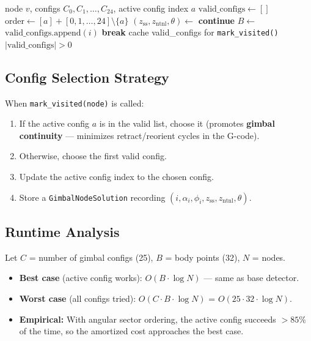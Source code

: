 \documentclass[11pt,a4paper]{article}
\newcommand{\Oh}[1]{$O(#1)$}
\newcommand{\funcname}[1]{\texttt{\textcolor{codepurple}{#1}}}
\begin{document}
\begin{algorithm}[H]
\caption{Gimbal Solver Validity Check}
\begin{algorithmic}[1]
\Require node $v$, configs $C_0, C_1, \ldots, C_{24}$, active config index $a$
\State $\text{valid\_configs} \gets []$
\State $\text{order} \gets [a] + [0, 1, \ldots, 24] \setminus \{a\}$ 
    \State $(z_\text{ss}, z_\text{ntnl}, \theta) \gets$ 
     \textbf{continue} \EndIf
    \State $B \gets$ 
        \State $\text{valid\_configs}.\text{append}(i)$
         \textbf{break} 
        \EndIf
    \EndIf
\EndFor
\State cache valid\_configs for \funcname{mark\_visited()}
\Return $|\text{valid\_configs}| > 0$
\end{algorithmic}
\end{algorithm}

\subsection{Config Selection Strategy}

When \funcname{mark\_visited(node)} is called:
\begin{enumerate}[nosep]
    \item If the active config $a$ is in the valid list, choose it (promotes \textbf{gimbal continuity} --- minimizes retract/reorient cycles in the G-code).
    \item Otherwise, choose the first valid config.
    \item Update the active config index to the chosen config.
    \item Store a \texttt{GimbalNodeSolution} recording $(i, \alpha_i, \phi_i, z_\text{ss}, z_\text{ntnl}, \theta)$.
\end{enumerate}

\subsection{Runtime Analysis}

Let $C$ = number of gimbal configs (25), $B$ = body points (32), $N$ = nodes.

\begin{itemize}[nosep]
    \item \textbf{Best case} (active config works): \Oh{B \cdot \log N} --- same as base detector.
    \item \textbf{Worst case} (all configs tried): \Oh{C \cdot B \cdot \log N} = \Oh{25 \cdot 32 \cdot \log N}.
    \item \textbf{Empirical:} With angular sector ordering, the active config succeeds $>85\%$ of the time, so the amortized cost approaches the best case.
\end{itemize}
\end{document}
